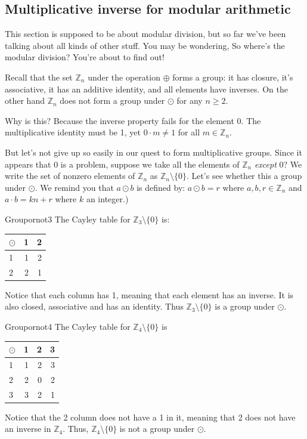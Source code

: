 \subsection{Multiplicative inverse for modular arithmetic\label{subsec:MultInve}}
This section is supposed to be about modular division, but so far we've been talking about all kinds of other stuff. You may be wondering, So where's the modular division? You're about to find out!

Recall that the set $\mathbb{Z}_n$ under the operation $\oplus$ forms a group:  
it has closure, it's associative, it has an additive identity, and all elements have inverses.  On the other hand $\mathbb{Z}_n$ does not form a group under $\odot$ for any $n \ge 2$.  


Why is this? Because the inverse property fails for the element 0. The multiplicative identity must be 1, yet $0\cdot m \neq 1$ for all $m\in \mathbb{Z}_n$.

But let's not give up so easily in our quest to form multiplicative groups. Since it appears that 0 is a problem, suppose we take all the elements of $\mathbb{Z}_n$ \emph{except} 0? We write the set of nonzero elements of $\mathbb{Z}_n$ as $\mathbb{Z}_n \setminus \{0\} $. Let's see whether this a group under $\odot$. We remind you that $a \odot b$  is defined by: $a \odot b = r$ where $a,b,r\in \mathbb{Z}_n$ and $a \cdot b = kn + r$ where $k$ an integer.)


\begin{example}{Groupornot3}
The Cayley table for $\mathbb{Z}_3 \setminus \{0\}$ is:


\begin{tabular}{ l | r r  }
  $\odot$ & 1 & 2 \\
  \hline
  1 & 1 & 2 \\
  2 & 2 & 1 \\
\end{tabular}


Notice that each column has 1, meaning that each element has an inverse.  It is also closed, associative and has an identity. Thus $\mathbb{Z}_3 \setminus \{0\}$ is a group under $\odot$.  
\end{example}


\begin{example}{Groupornot4}
The Cayley table for $\mathbb{Z}_4 \setminus \{0\}$ is


\begin{tabular}{ l | r r r }
  $\odot$ & 1 & 2 & 3\\
  \hline
  1 & 1 & 2 & 3\\
  2 & 2 & 0 & 2\\
  3 & 3 & 2 & 1\\
\end{tabular}

Notice that the 2 column does not have a 1 in it, meaning that 2 does not have an inverse in $\mathbb{Z}_4$. Thus, $\mathbb{Z}_4 \setminus \{0\}$ is not a group under $\odot$.
\end{example}

